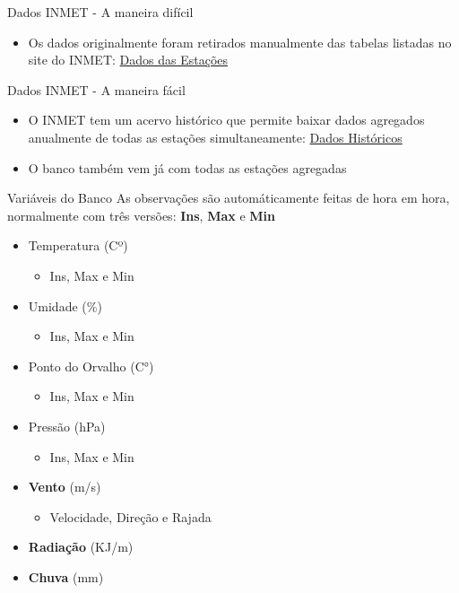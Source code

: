 \documentclass[aspectratio=1610]{beamer}
\begin{document}
\begin{frame}{Dados INMET - A maneira difícil}
    \begin{itemize}
        \item Os dados originalmente foram retirados manualmente das tabelas listadas no site do INMET: \href{https://tempo.inmet.gov.br/TabelaEstacoes/A001}{Dados das Estações}
    \end{itemize}
\end{frame}

\begin{frame}{Dados INMET - A maneira fácil}
    \begin{itemize}
        \item O INMET tem um acervo histórico que permite baixar dados agregados anualmente de todas as estações simultaneamente: \href{https://portal.inmet.gov.br/dadoshistoricos}{Dados Históricos}
        \item O banco também vem já com todas as estações agregadas
    \end{itemize}
\end{frame}

\begin{frame}{Variáveis do Banco}
    As observações são automáticamente feitas de hora em hora, normalmente com três versões: \textbf{Ins}, \textbf{Max} e \textbf{Min}
    \pause
    \begin{itemize}
        \item Temperatura (Cº)
        \begin{itemize}
            \item Ins, Max e Min
        \end{itemize}
        \pause
        \item Umidade (\%)
        \begin{itemize}
            \item Ins, Max e Min
        \end{itemize}
        \pause
        \item Ponto do Orvalho (C°)
        \begin{itemize}
            \item Ins, Max e Min
        \end{itemize}
        \pause
        \item Pressão (hPa)
        \begin{itemize}
            \item Ins, Max e Min
        \end{itemize}
        \pause
        \item \textbf{Vento} (m/s)
        \begin{itemize}
            \item Velocidade, Direção e Rajada
        \end{itemize}
        \pause
        \item \textbf{Radiação} (KJ/m)
        \pause
        \item \textbf{Chuva} (mm)
    \end{itemize}
\end{frame}
\end{document}
